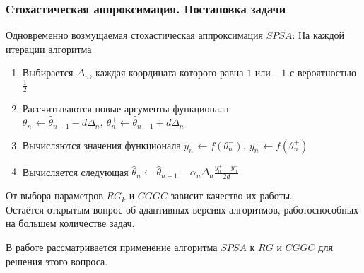 \begin{frame}
	\frametitle{Стохастическая аппроксимация. Постановка задачи}
	Одновременно возмущаемая стохастическая аппроксимация $SPSA$:
	На каждой итерации алгоритма
	\begin{enumerate}
		\item Выбирается  $\Delta_n$, каждая координата которого равна $1$ или $-1$ с вероятностью $\frac{1}{2}$
		\item Рассчитываются новые аргументы функционала
		$\theta_{n}^{-} \leftarrow \hat{\theta}_{n - 1} - d\Delta_{n},\ \theta_{n}^{+} \leftarrow \hat{\theta}_{n - 1} + d\Delta_{n}$
		\item Вычисляются значения функционала $y_n^{-} \leftarrow f(\theta_{n}^{-}),\ y_n^{+} \leftarrow f(\theta_{n}^{+})$
		\item Вычисляется следующая  $\hat{\theta}_n \leftarrow \hat{\theta}_{n - 1} - \alpha_n \Delta_{n} \frac{y_n^{+} - y_n^{-}}{2d}$
	\end{enumerate}

	\pause

	От выбора параметров $RG_k$ и $CGGC$ зависит качество их работы.\\
	Остаётся открытым вопрос об адаптивных версиях алгоритмов, работоспособных на большем количестве задач.\vspace{.5em}

	В работе рассматривается применение алгоритма $SPSA$ к $RG$ и $CGGC$ для решения этого вопроса.
\end{frame}


